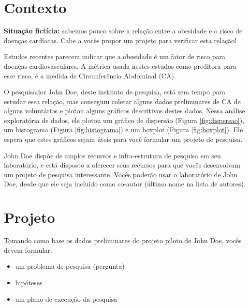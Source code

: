 \documentclass[a4paper]{article}
\begin{document}
\section{Contexto}

{\bf Situação fictícia:} sabemos pouco sobre a relação entre a
obesidade e o risco de doenças cardíacas. Cabe a vocês propor um
projeto para verificar esta relação!

Estudos recentes parecem indicar que a obesidade é um fator de risco
para doenças cardiovasculares. A métrica usada nestes estudos como
preditora para esse risco, é a medida de Circunferência Abdominal
(CA).

O pesquisador John Doe, deste instituto de pesquisa, está sem tempo
para estudar essa relação, mas conseguiu coletar alguns dados
preliminares de CA de alguns voluntários e plotou alguns gráficos
descritivos destes dados. Nessa análise exploratória de dados, ele
plotou um gráfico de dispersão (Figura \ref{fig:dispersao}), um
histograma (Figura \ref{fig:histograma}) e um boxplot (Figura
\ref{fig:boxplot}). Ele espera que estes gráficos sejam úteis para
você formular um projeto de pesquisa.

John Doe dispõe de amplos recursos e infra-estrutura de pesquisa em
seu laboratório, e está disposto a oferecer seus recursos para que
vocês desenvolvam um projeto de pesquisa interessante. Vocês poderão
usar o laboratório de John Doe, desde que ele seja incluído como
co-autor (último nome na lista de autores).


\section{Projeto}

Tomando como base os dados preliminares do projeto piloto de John Doe,
vocês devem formular:

\begin{itemize}
\item um problema de pesquisa (pergunta)
\item hipóteses
\item um plano de execução da pesquisa
\end{itemize}
\end{document}
